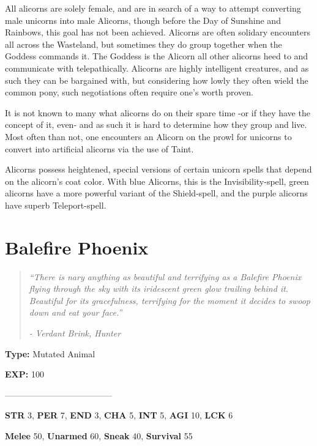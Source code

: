 \documentclass[11pt,a4paper,twocolumn]{book}
\begin{document}
	All alicorns are solely female, and are in search of a way to attempt converting male unicorns into male Alicorns, though before the Day of Sunshine and Rainbows, this goal has not been achieved.
	Alicorns are often solidary encounters all across the Wasteland, but sometimes they do group together when the Goddess commands it.
	The Goddess is the Alicorn all other alicorns heed to and communicate with telepathically.
	Alicorns are highly intelligent creatures, and as such they can be bargained with, but considering how lowly they often wield the common pony, such negotiations often require one's worth proven.
	
	It is not known to many what alicorns do on their spare time -or if they have the concept of it, even- and as such it is hard to determine how they group and live. Most often than not, one encounters an Alicorn on the prowl for unicorns to convert into artificial alicorns via the use of Taint.
	
	Alicorns possess heightened, special versions of certain unicorn spells that depend on the alicorn's coat color. With blue Alicorns, this is the Invisibility-spell, green alicorns have a more powerful variant of the Shield-spell, and the purple alicorns have superb Teleport-spell.
	
	
	\clearpage	
	

	
	\section*{Balefire Phoenix}
	\begin{quote}
		\emph{``There is nary anything as beautiful and terrifying as a Balefire Phoenix flying through the sky with its iridescent green glow trailing behind it. Beautiful for its gracefulness, terrifying for the moment it decides to swoop down and eat your face.''}
		
		\emph{-	Verdant Brink, Hunter}
	\end{quote}
	
	\noindent
	\textbf{Type:} Mutated Animal

	\noindent
	\textbf{EXP:} 100
	
	--------------------------------------
	
	\noindent
	\textbf{STR} 3, \textbf{PER} 7, \textbf{END} 3, \textbf{CHA} 5, \textbf{INT} 5, \textbf{AGI} 10, \textbf{LCK} 6
	
	\noindent
	\textbf{Melee} 50, \textbf{Unarmed} 60, \textbf{Sneak} 40, \textbf{Survival} 55
	
\end{document}

